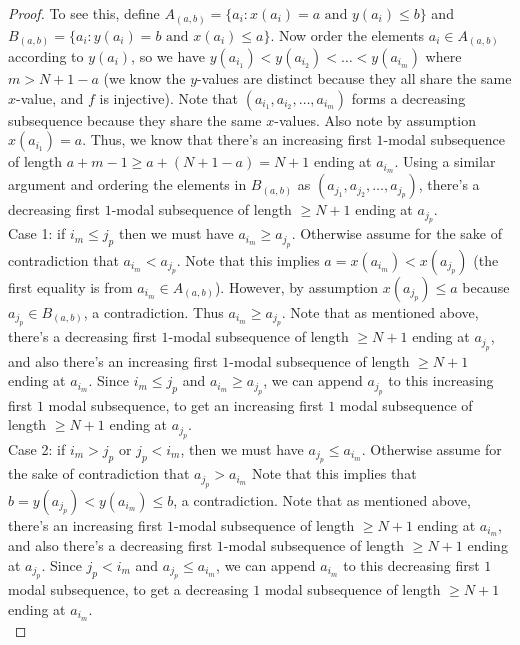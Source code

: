 \documentclass{article}
\begin{document}
\begin{proof}
To see this, define $A_{(a,b)} = \{a_i : x(a_i) = a \text{ and } y(a_i) \leq b\}$ and $B_{(a,b)} = \{a_i : y(a_i) = b \text{ and } x(a_i) \leq a\}$. Now order the elements $a_i \in A_{(a,b)}$ according to $y(a_i)$, so we have $y(a_{i_1}) < y(a_{i_2}) < \ldots < y(a_{i_m})$ where $m > N+1-a$ (we know the $y$-values are distinct because they all share the same $x$-value, and $f$ is injective). Note that $(a_{i_1}, a_{i_2}, \ldots, a_{i_m})$ forms a decreasing subsequence because they share the same $x$-values. Also note by assumption $x(a_{i_1}) = a$. Thus, we know that there's an increasing first $1$-modal subsequence of length $a + m - 1 \geq a + (N+1-a) = N+1$ ending at $a_{i_m}$. Using a similar argument and ordering the elements in $B_{(a,b)}$ as $(a_{j_1}, a_{j_2}, \ldots, a_{j_p})$, there's a decreasing first $1$-modal subsequence of length $\geq N+1$ ending at $a_{j_p}$. \\

Case 1: if $i_m \leq j_p$ then we must have $a_{i_m} \geq a_{j_p}$. Otherwise assume for the sake of contradiction that $a_{i_m} < a_{j_p}$. Note that this implies $a = x(a_{i_m}) < x(a_{j_p})$ (the first equality is from $a_{i_m} \in A_{(a,b)}$). However, by assumption $x(a_{j_p}) \leq a$ because $a_{j_p} \in B_{(a,b)}$, a contradiction. Thus $a_{i_m} \geq a_{j_p}$. Note that as mentioned above, there's a decreasing first $1$-modal subsequence of length $\geq N+1$ ending at $a_{j_p}$, and also there's an increasing first $1$-modal subsequence of length $\geq N+1$ ending at $a_{i_m}$. Since $i_m \leq j_p$ and $a_{i_m} \geq a_{j_p}$, we can append $a_{j_p}$ to this increasing first $1$ modal subsequence, to get an increasing first $1$ modal subsequence of length $\geq N+1$ ending at $a_{j_p}$. \\

Case 2: if $i_m > j_p$ or $j_p < i_m$, then we must have $a_{j_p} \leq a_{i_m}$. Otherwise assume for the sake of contradiction that $a_{j_p} > a_{i_m}$ Note that this implies that $b = y(a_{j_p}) < y(a_{i_m}) \leq b$, a contradiction. Note that as mentioned above, there's an increasing first $1$-modal subsequence of length $\geq N+1$ ending at $a_{i_m}$, and also there's a decreasing first $1$-modal subsequence of length $\geq N+1$ ending at $a_{j_p}$. Since $j_p < i_m$ and $a_{j_p} \leq a_{i_m}$, we can append $a_{i_m}$ to this decreasing first $1$ modal subsequence, to get a decreasing $1$ modal subsequence of length $\geq N+1$ ending at $a_{i_m}$. \\


\end{proof}
\end{document}
